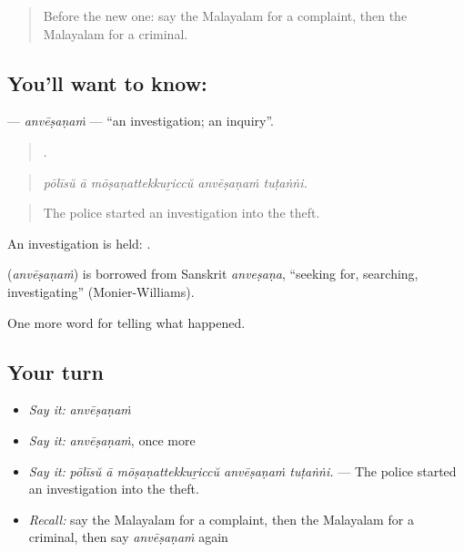 \label{lesson:ML-C365-anvesanam}



\begin{quote}
Before the new one: say the Malayalam for a complaint, then the Malayalam for a criminal.
\end{quote}

\subsection*{You'll want to know: }
\textbf{} — \emph{anvēṣaṇaṁ} — \textquotedblleft{}an investigation; an inquiry\textquotedblright{}.

\begin{quote}
    .
\end{quote}

\begin{quote}
\emph{pōlīsŭ ā mōṣaṇattekkuṟiccŭ anvēṣaṇaṁ tuṭaṅṅi.}
\end{quote}

\begin{quote}
The police started an investigation into the theft.
\end{quote}

An investigation is held:  .

\begin{cousinweb}
\textbf{} (\emph{anvēṣaṇaṁ}) is borrowed from Sanskrit \emph{anveṣaṇa}, \textquotedblleft{}seeking for, searching, investigating\textquotedblright{} (Monier-Williams).
\end{cousinweb}

\begin{grammarlens}[title={What you've built}]
One more word for telling what happened.
\end{grammarlens}

\subsection*{Your turn}
\begin{itemize}
\raggedright
  \item \emph{Say it:} \emph{anvēṣaṇaṁ}
  \item \emph{Say it:} \emph{anvēṣaṇaṁ}, once more
  \item \emph{Say it:} \emph{pōlīsŭ ā mōṣaṇattekkuṟiccŭ anvēṣaṇaṁ tuṭaṅṅi.} — The police started an investigation into the theft.
  \item \emph{Recall:} say the Malayalam for a complaint, then the Malayalam for a criminal, then say \emph{anvēṣaṇaṁ} again
\end{itemize}

